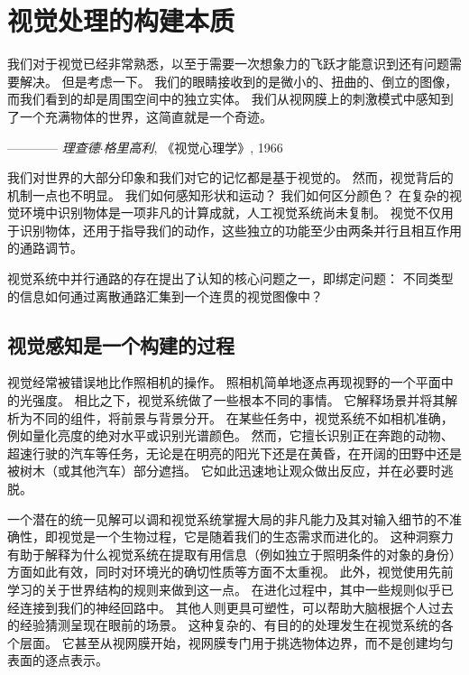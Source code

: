 \chapter{视觉处理的构建本质} \label{chap:chap21}

我们对于视觉已经非常熟悉，以至于需要一次想象力的飞跃才能意识到还有问题需要解决。
但是考虑一下。
我们的眼睛接收到的是微小的、扭曲的、倒立的图像，而我们看到的却是周围空间中的独立实体。
我们从视网膜上的刺激模式中感知到了一个充满物体的世界，这简直就是一个奇迹。

\begin{flushright}
	———— \textit{理查德$\cdot$格里高利}, 《视觉心理学》, 1966 \hfill
\end{flushright}



我们对世界的大部分印象和我们对它的记忆都是基于视觉的。
然而，视觉背后的机制一点也不明显。
我们如何感知形状和运动？
我们如何区分颜色？
在复杂的视觉环境中识别物体是一项非凡的计算成就，人工视觉系统尚未复制。
视觉不仅用于识别物体，还用于指导我们的动作，这些独立的功能至少由两条并行且相互作用的通路调节。


视觉系统中并行通路的存在提出了认知的核心问题之一，即绑定问题：
不同类型的信息如何通过离散通路汇集到一个连贯的视觉图像中？



\section{视觉感知是一个构建的过程}

视觉经常被错误地比作照相机的操作。
照相机简单地逐点再现视野的一个平面中的光强度。
相比之下，视觉系统做了一些根本不同的事情。
它解释场景并将其解析为不同的组件，将前景与背景分开。
在某些任务中，视觉系统不如相机准确，例如量化亮度的绝对水平或识别光谱颜色。
然而，它擅长识别正在奔跑的动物、超速行驶的汽车等任务，无论是在明亮的阳光下还是在黄昏，在开阔的田野中还是被树木（或其他汽车）部分遮挡。
它如此迅速地让观众做出反应，并在必要时逃脱。


一个潜在的统一见解可以调和视觉系统掌握大局的非凡能力及其对输入细节的不准确性，即视觉是一个生物过程，它是随着我们的生态需求而进化的。
这种洞察力有助于解释为什么视觉系统在提取有用信息（例如独立于照明条件的对象的身份）方面如此有效，同时对环境光的确切性质等方面不太重视。
此外，视觉使用先前学习的关于世界结构的规则来做到这一点。
在进化过程中，其中一些规则似乎已经连接到我们的神经回路中。
其他人则更具可塑性，可以帮助大脑根据个人过去的经验猜测呈现在眼前的场景。
这种复杂的、有目的的处理发生在视觉系统的各个层面。 
它甚至从视网膜开始，视网膜专门用于挑选物体边界，而不是创建均匀表面的逐点表示。


